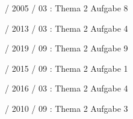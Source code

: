 \documentclass{lehramt-informatik-haupt}
\begin{document}
%

 / 2005 / 03 : Thema 2 Aufgabe 8

%

 / 2013 / 03 : Thema 2 Aufgabe 4

%

 / 2019 / 09 : Thema 2 Aufgabe 9

%

 / 2015 / 09 : Thema 2 Aufgabe 1

%

 / 2016 / 03 : Thema 2 Aufgabe 4

%

 / 2010 / 09 : Thema 2 Aufgabe 3

\literatur
\end{document}
